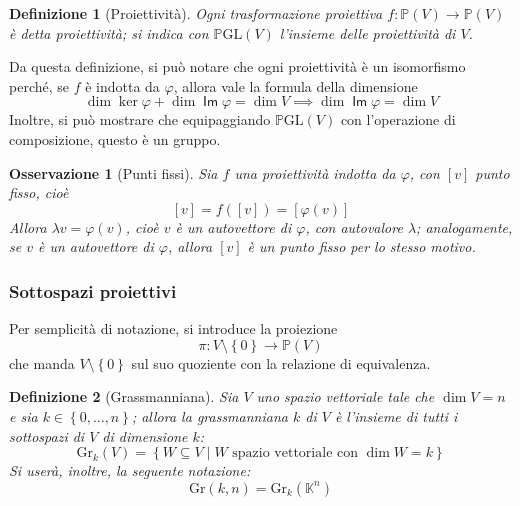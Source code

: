 \documentclass[11pt]{scrartcl}
\theoremstyle{style1}
\newtheorem{osservazione}{Osservazione}[section]
\newtheorem{definizione}{Definizione}[section]
\numberwithin{equation}{subsection}
\renewcommand{\operatorname}[1]{\mathop{\mathrm{\textsf{#1}}}}
\begin{document}
\begin{definizione}
[Proiettivit\`a]
Ogni trasformazione proiettiva $f:\mathbb{P}(V) \to \mathbb{P}(V)$ \`e detta \textit{proiettivit\`a}; si indica con $\mathbb{P}\mathrm{GL} (V)$ l'insieme delle proiettivit\`a di $V$.
\end{definizione}
\noindent Da questa definizione, si pu\`o notare che ogni proiettivit\`a \`e un isomorfismo perch\'e, se $f$ \`e indotta da $\varphi $, allora vale la formula della dimensione 
\[
	\dim \ker \varphi + \dim \operatorname{Im} \varphi = \dim V \implies \dim \operatorname{Im} \varphi  = \dim V
\] 
Inoltre, si pu\`o mostrare che equipaggiando $\mathbb{P}\mathrm{GL} (V)$ con l'operazione di composizione, questo \`e un gruppo.
\begin{osservazione}
	[Punti fissi]
	Sia $f$ una proiettivit\`a indotta da $\varphi $, con $[v]$ punto fisso, cio\`e
	\[
		[v]  = f([v]) = [\varphi (v)]
	\] 
	Allora $\lambda v = \varphi (v)$, cio\`e $v$ \`e un autovettore di $\varphi $, con autovalore $\lambda $; analogamente, se $v$ \`e un autovettore di $\varphi $, allora $[v]$ \`e un punto fisso per lo stesso motivo.
\end{osservazione}
\subsubsection{Sottospazi proiettivi}
Per semplicit\`a di notazione, si introduce la proiezione
\begin{equation}
	\pi : V \setminus \left\{ 0 \right\} \to \mathbb{P}(V)
\end{equation}
che manda $V \setminus \left\{ 0 \right\} $ sul suo quoziente con la relazione di equivalenza.
\begin{definizione}
	[Grassmanniana]
	Sia $V$ uno spazio vettoriale tale che $\dim V = n$ e sia $k \in \left\{ 0,\ldots,n \right\}$; allora la \textit{grassmanniana} $k$ di $V$ \`e l'insieme di tutti i sottospazi di $V$ di dimensione $k$:
	\[
	\mathrm{Gr} _k (V) = \left\{ W \subseteq V  \mid W \text{ spazio vettoriale con } \dim W = k \right\} 
	\] 
Si user\`a, inoltre, la seguente notazione:
\[
\mathrm{Gr}  (k,n) = \mathrm{Gr}  _{k} (\mathbb{K}^{n} )
\] 
\end{definizione}
\end{document}
